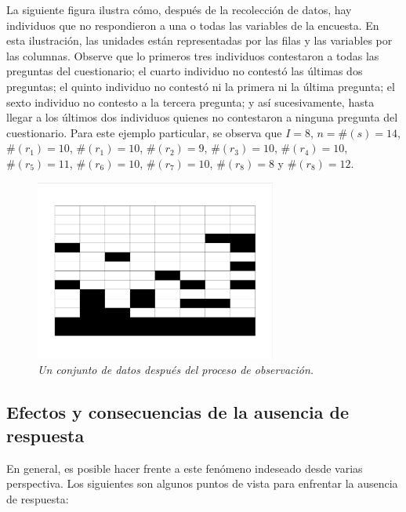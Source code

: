 \documentclass[
  10pt,
  spanish,
]{book}
\begin{document}
La siguiente figura ilustra cómo, después de la recolección de datos, hay individuos que no respondieron a una o todas las variables de la encuesta. En esta ilustración, las unidades están representadas por las filas y las variables por las columnas. Observe que lo primeros tres individuos contestaron a todas las preguntas del cuestionario; el cuarto individuo no contestó las últimas dos preguntas; el quinto individuo no contestó ni la primera ni la última pregunta; el sexto individuo no contesto a la tercera pregunta; y así sucesivamente, hasta llegar a los últimos dos individuos quienes no contestaron a ninguna pregunta del cuestionario. Para este ejemplo particular, se observa que \(I=8\), \(n=\#(s)=14\), \(\#(r_1)=10\), \(\#(r_1)=10\), \(\#(r_2)=9\), \(\#(r_3)=10\), \(\#(r_4)=10\), \(\#(r_5)=11\), \(\#(r_6)=10\), \(\#(r_7)=10\), \(\#(r_8)=8\) y \(\#(r_8)=12\).

\begin{figure}
\centering
\includegraphics[width=3.125in,height=\textheight]{Pics/j1.png}
\caption{\emph{Un conjunto de datos después del proceso de observación.}}
\end{figure}

\hypertarget{efectos-y-consecuencias-de-la-ausencia-de-respuesta}{%
\subsection{Efectos y consecuencias de la ausencia de respuesta}\label{efectos-y-consecuencias-de-la-ausencia-de-respuesta}}

En general, es posible hacer frente a este fenómeno indeseado desde varias perspectiva. Los siguientes son algunos puntos de vista para enfrentar la ausencia de respuesta:
\end{document}
